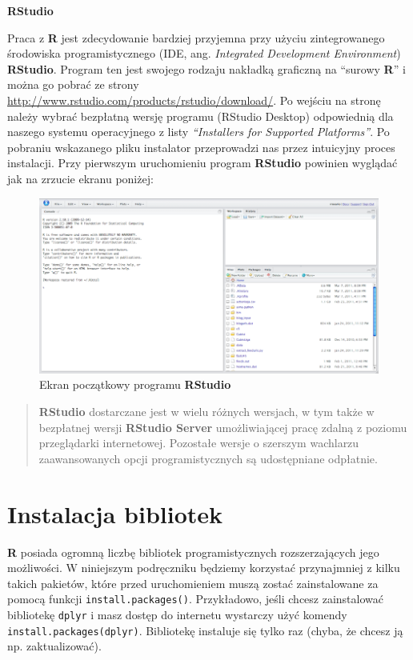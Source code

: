 \documentclass[]{book}
\theoremstyle{definition}
\theoremstyle{definition}
\theoremstyle{definition}
\theoremstyle{remark}
\begin{document}
\textbf{RStudio}

Praca z \textbf{R} jest zdecydowanie bardziej przyjemna przy użyciu
zintegrowanego środowiska programistycznego (IDE, ang. \emph{Integrated
Development Environment}) \textbf{RStudio}. Program ten jest swojego
rodzaju nakładką graficzną na ``surowy \textbf{R}'' i można go pobrać ze
strony \url{http://www.rstudio.com/products/rstudio/download/}. Po
wejściu na stronę należy wybrać bezpłatną wersję programu (RStudio
Desktop) odpowiednią dla naszego systemu operacyjnego z listy
\emph{``Installers for Supported Platforms''}. Po pobraniu wskazanego
pliku instalator przeprowadzi nas przez intuicyjny proces instalacji.
Przy pierwszym uruchomieniu program \textbf{RStudio} powinien wyglądać
jak na zrzucie ekranu poniżej:

\begin{figure}
\centering
\includegraphics{figures/rstudio.png}
\caption{Ekran początkowy programu \textbf{RStudio}}
\end{figure}

\begin{quote}
\textbf{RStudio} dostarczane jest w wielu różnych wersjach, w tym także
w bezpłatnej wersji \textbf{RStudio Server} umożliwiającej pracę zdalną
z poziomu przeglądarki internetowej. Pozostałe wersje o szerszym
wachlarzu zaawansowanych opcji programistycznych są udostępniane
odpłatnie.
\end{quote}

\section*{Instalacja bibliotek}\label{instalacja-bibliotek}

\textbf{R} posiada ogromną liczbę bibliotek programistycznych
rozszerzających jego możliwości. W niniejszym podręczniku będziemy
korzystać przynajmniej z kilku takich pakietów, które przed
uruchomieniem muszą zostać zainstalowane za pomocą funkcji
\texttt{install.packages()}. Przykładowo, jeśli chcesz zainstalować
bibliotekę \texttt{dplyr} i masz dostęp do internetu wystarczy użyć
komendy
\texttt{install.packages(\textquotesingle{}dplyr\textquotesingle{})}.
Bibliotekę instaluje się tylko raz (chyba, że chcesz ją np.
zaktualizować).
\end{document}
